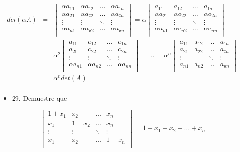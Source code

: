 \documentclass[
]{article}
\begin{document}
\[\begin{matrix}
det(\alpha A) & = & \begin{vmatrix}
\alpha a_{11} & \alpha a_{12} & \ldots & \alpha a_{1n} \\
\alpha a_{21} & \alpha a_{22} & \ldots & \alpha a_{2n} \\
 \vdots & \vdots & \ddots & \vdots \\
\alpha a_{n1} & \alpha a_{n2} & \ldots & \alpha a_{nn} \\
\end{vmatrix} = \alpha\begin{vmatrix}
a_{11} & a_{12} & \ldots & a_{1n} \\
\alpha a_{21} & \alpha a_{22} & \ldots & \alpha a_{2n} \\
 \vdots & \vdots & \ddots & \vdots \\
\alpha a_{n1} & \alpha a_{n2} & \ldots & \alpha a_{nn} \\
\end{vmatrix} \\
 & = & \alpha^{2}\begin{vmatrix}
a_{11} & a_{12} & \ldots & a_{1n} \\
a_{21} & a_{22} & \ldots & a_{2n} \\
 \vdots & \vdots & \ddots & \vdots \\
\alpha a_{n1} & \alpha a_{n2} & \ldots & \alpha a_{nn} \\
\end{vmatrix} = \ldots = \alpha^{n}\begin{vmatrix}
a_{11} & a_{12} & \ldots & a_{1n} \\
a_{21} & a_{22} & \ldots & a_{2n} \\
 \vdots & \vdots & \ddots & \vdots \\
a_{n1} & a_{n2} & \ldots & a_{nn} \\
\end{vmatrix} \\
 & = & \alpha^{n}det(A) \\
\end{matrix}\]

\begin{itemize}
\item
  29. Demuestre que
\end{itemize}

\[\begin{vmatrix}
1 + x_{1} & x_{2} & \ldots & x_{n} \\
x_{1} & 1 + x_{2} & \ldots & x_{n} \\
 \vdots & \vdots & \ddots & \vdots \\
x_{1} & x_{2} & \ldots & 1 + x_{n} \\
\end{vmatrix} = 1 + x_{1} + x_{2} + \ldots + x_{n}\]
\end{document}
